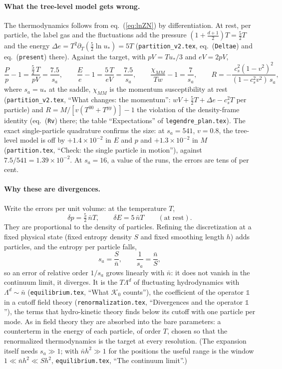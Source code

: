 \documentclass[11pt,aps,preprint,nofootinbib,superscriptaddress,tightenlines]{revtex4-2}
\newcommand{\one}{\mathds{1}}
\def\st{\begin{equation}}
\def\stp{\end{equation}}
\def\Eq#1{eq.~(\ref{#1})}
\let\oldparagraph\paragraph
\renewcommand{\paragraph}{\par\bigskip\oldparagraph}
\begin{document}
\paragraph{What the tree-level model gets wrong.}  The thermodynamics follows from \Eq{eq:lnZN} by differentiation.  At rest, per particle, the label
gas and the fluctuations add the pressure $(1+\tfrac{d+1}2)T=\tfrac52T$ and the energy $\Delta e=T^2\partial_T(\tfrac52\ln u_*)=5T$
(\nolinkurl{partition_v2.tex}, eq.~(\texttt{Deltae}) and eq.~(\texttt{present}) there).  Against the target, with $pV=Tu_*/3$ and $eV=2pV$,
\st
\frac{P}{p}-1=\frac{\tfrac52\,T}{pV}=\frac{7.5}{s_a},\qquad
\frac{E}{e}-1=\frac{5\,T}{eV}=\frac{7.5}{s_a},\qquad
\frac{\chi_{MM}}{Tw}-1=\frac{7}{s_a},\qquad
R=-\frac{c_s^2(1-v^2)^2}{(1-c_s^2v^2)\,s_a} ,
\label{eq:treeerr}
\stp
where $s_a=u_*$ at the saddle, $\chi_{MM}$ is the momentum susceptibility at rest (\nolinkurl{partition_v2.tex}, ``What changes: the momentum'':
$wV+\tfrac52T+\Delta e-c_s^2T$ per particle) and $R=M/[v(T^{00}+T^{yy})]-1$ the violation of the density-frame identity (eq.~(\texttt{Rv}) there; the table
``Expectations'' of \nolinkurl{legendre_plan.tex}).  The exact single-particle quadrature confirms the size: at $s_a=541$, $v=0.8$, the tree-level
model is off by $+1.4\times10^{-2}$ in $E$ and $p$ and $+1.3\times10^{-2}$ in $M$ (\nolinkurl{partition.tex}, ``Check: the single particle in
motion''), against $7.5/541=1.39\times10^{-2}$.  At $s_a=16$, a value of the runs, the errors are tens of per cent.

\paragraph{Why these are divergences.}  Write the errors per unit volume: at the temperature $T$,
\st
\delta p=\tfrac52\,\bar nT,\qquad \delta E=5\,\bar nT\qquad(\text{at rest}) .
\label{eq:linear}
\stp
They are proportional to the density of particles.  Refining the discretization at a fixed physical state (fixed entropy density $S$ and fixed
smoothing length $h$) adds particles, and the entropy per particle falls,
\st
s_a=\frac{S}{\bar n},\qquad \frac1{s_a}=\frac{\bar n}{S} ,
\stp
so an error of relative order $1/s_a$ grows linearly with $\bar n$: it does not vanish in the continuum limit, it diverges.  It is the
$T\Lambda^d$ of fluctuating hydrodynamics with $\Lambda^d\sim\bar n$ (\nolinkurl{equilibrium.tex}, ``What $\mathcal K_0$ counts''), the coefficient of
the operator $\one$ in a cutoff field theory (\nolinkurl{renormalization.tex}, ``Divergences and the operator $\one$''), the terms that
hydro-kinetic theory finds below its cutoff with one particle per mode.  As in field theory they are absorbed into the bare parameters: a
counterterm in the energy of each particle, of order $T$, chosen so that the renormalized thermodynamics is the target at every resolution.
(The expansion itself needs $s_a\gg1$; with $\bar nh^2\gg1$ for the positions the useful range is the window $1\ll\bar nh^2\ll Sh^2$,
\nolinkurl{equilibrium.tex}, ``The continuum limit''.)
\end{document}
